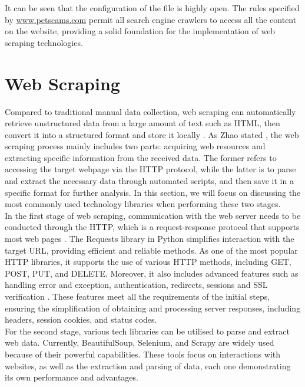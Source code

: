 \documentclass[ oneside,%
                    author={Cassie Qing Tang},
                    degree={BSc},
                     title={An Automated Response System for Disrupting Online Pet Scamming \\ },
                    subtitle={ }]{dissertation}
\begin{document}
It can be seen that the configuration of the file is highly open. The rules specified by \url{www.petscams.com} permit all search engine crawlers to access all the content on the website, providing a solid foundation for the implementation of web scraping technologies.


\section{Web Scraping}
Compared to traditional manual data collection, web scraping can automatically retrieve unstructured data from a large amount of text such as HTML, then convert it into a structured format and store it locally \cite{khder_web_2021}. As Zhao stated \cite{zhao_web_2017}, the web scraping process mainly includes two parts: acquiring web resources and extracting specific information from the received data. The former refers to accessing the target webpage via the HTTP protocol, while the latter is to parse and extract the necessary data through automated scripts, and then save it in a specific format for further analysis. In this section, we will focus on discussing the most commonly used technology libraries when performing these two stages.
\\

In the first stage of web scraping, communication with the web server needs to be conducted through the HTTP, which is a request-response protocol that supports most web pages \cite{chandra_python_2015}. The Requests library in Python simplifies interaction with the target URL, providing efficient and reliable methods. As one of the most popular HTTP libraries, it supports the use of various HTTP methods, including GET, POST, PUT, and DELETE. Moreover, it also includes advanced features such as handling error and exception, authentication, redirects, sessions and SSL verification \cite{noauthor_requests_nodate}. These features meet all the requirements of the initial steps, ensuring the simplification of obtaining and processing server responses, including headers, session cookies, and status codes.
\\

For the second stage, various tech libraries can be utilised to parse and extract web data. Currently, BeautifulSoup, Selenium, and Scrapy are widely used because of their powerful capabilities. These tools focus on interactions with websites, as well as the extraction and parsing of data, each one demonstrating its own performance and advantages.
\\
\end{document}
